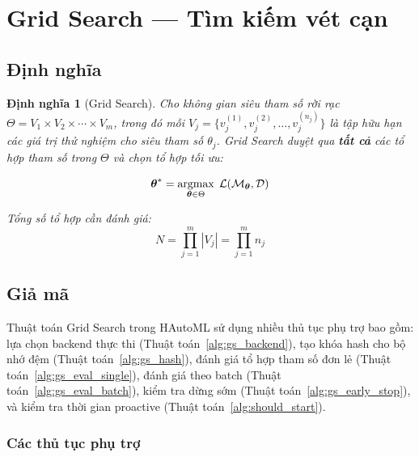 \documentclass[12pt,a4paper]{article}
\newtheorem{definition}{Định nghĩa}[section]
\newcommand{\argmax}{\operatornamewithlimits{argmax}}
\begin{document}
\newpage
\section{Grid Search --- Tìm kiếm vét cạn}
\label{sec:grid_search}

\subsection{Định nghĩa}

\begin{definition}[Grid Search]
Cho không gian siêu tham số rời rạc
$\Theta = V_1 \times V_2 \times \cdots \times V_m$, trong đó mỗi
$V_j = \{v_j^{(1)}, v_j^{(2)}, \ldots, v_j^{(n_j)}\}$ là tập hữu hạn các giá
trị thử nghiệm cho siêu tham số $\theta_j$. Grid Search duyệt qua
\textbf{tất cả} các tổ hợp tham số trong $\Theta$ và chọn tổ hợp tối ưu:

\begin{equation}
    \boldsymbol{\theta}^* = \argmax_{\boldsymbol{\theta} \in \Theta}\;
    \mathcal{L}(\mathcal{M}_{\boldsymbol{\theta}}, \mathcal{D})
    \label{eq:grid_search}
\end{equation}

\noindent Tổng số tổ hợp cần đánh giá:
\begin{equation}
    N = \prod_{j=1}^{m} |V_j| = \prod_{j=1}^{m} n_j
    \label{eq:grid_combinations}
\end{equation}
\end{definition}

\subsection{Giả mã}

Thuật toán Grid Search trong HAutoML sử dụng nhiều thủ tục phụ trợ bao gồm:
lựa chọn backend thực thi (Thuật toán~\ref{alg:gs_backend}),
tạo khóa hash cho bộ nhớ đệm (Thuật toán~\ref{alg:gs_hash}),
đánh giá tổ hợp tham số đơn lẻ (Thuật toán~\ref{alg:gs_eval_single}),
đánh giá theo batch (Thuật toán~\ref{alg:gs_eval_batch}),
kiểm tra dừng sớm (Thuật toán~\ref{alg:gs_early_stop}),
và kiểm tra thời gian proactive (Thuật toán~\ref{alg:should_start}).

\subsubsection{Các thủ tục phụ trợ}
\end{document}
